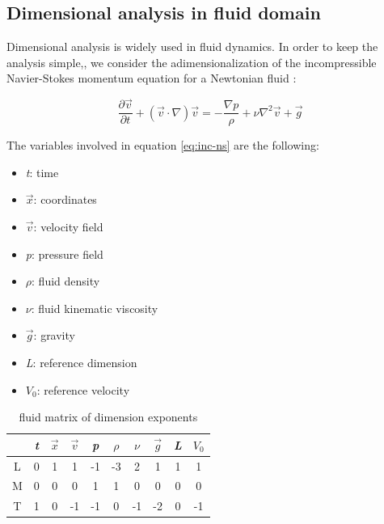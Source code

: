 \subsection{Dimensional analysis in fluid domain}
\label{sec:dim-fluid}

Dimensional analysis is widely used in fluid dynamics. In order to keep the analysis simple,, we consider the adimensionalization of the incompressible Navier-Stokes momentum equation for a Newtonian fluid \cite{fox2020fox}:

\begin{equation}
	\frac{\partial \vec{v}}{\partial t} + \left(\vec{v} \cdot \nabla \right) \vec{v} = -\frac{\nabla p}{\rho} + \nu \nabla ^2 \vec{v} + \vec{g}
	\label{eq:inc-ns}
\end{equation}

The variables involved in equation \ref{eq:inc-ns} are the following:

\begin{itemize}
	\item \textit{t}: time
	\item $\vec{x}$: coordinates
	\item $\vec{v}$: velocity field
	\item \textit{p}: pressure field
	\item $\rho$: fluid density
	\item $\nu$: fluid kinematic viscosity
	\item $\vec{g}$: gravity
	\item \textit{L}: reference dimension
	\item $V_0$: reference velocity
\end{itemize}




\begin{table}[!h]
\begin{center}
	\begin{tabular}{ c|c c c c c c c c c} 
		  & \textit{t} & $\vec{x}$ & $\vec{v}$ & \textit{p} & $\rho$ & $\nu$ & $\vec{g}$ & \textit{L} & $V_0$  \\ 
		\hline
		L & 0 & 1 & 1  & -1 & -3 & 2  & 1  & 1 & 1  \\ 
		M & 0 & 0 & 0  &  1 &  1 & 0  & 0  & 0 & 0  \\
		T & 1 & 0 & -1 & -1 &  0 & -1 & -2 & 0 & -1 \\ 
	\end{tabular}
\end{center}
\caption{fluid  matrix of dimension exponents}
\label{table:dim-fluid}
\end{table}

